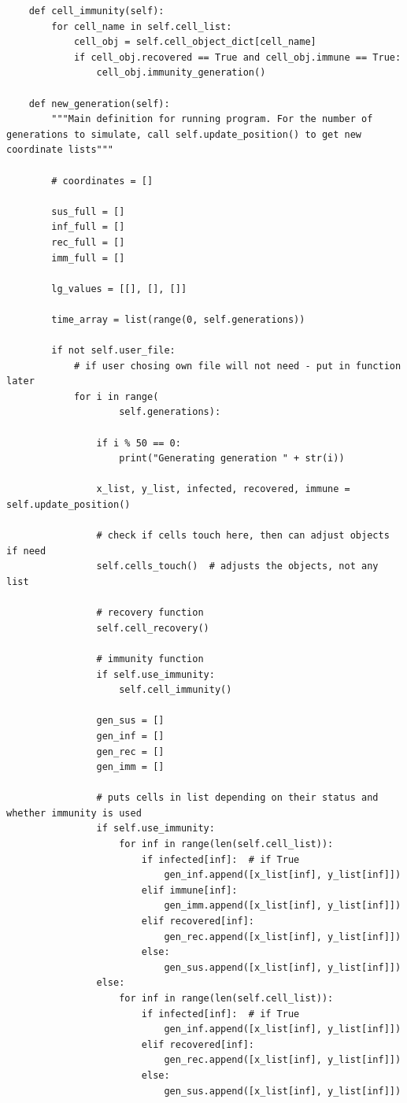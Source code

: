 \documentclass[11pt, a4paper]{article}
\begin{document}
\begin{lstlisting}
    def cell_immunity(self):
        for cell_name in self.cell_list:
            cell_obj = self.cell_object_dict[cell_name]
            if cell_obj.recovered == True and cell_obj.immune == True:
                cell_obj.immunity_generation()

    def new_generation(self):
        """Main definition for running program. For the number of generations to simulate, call self.update_position() to get new coordinate lists"""

        # coordinates = []

        sus_full = []
        inf_full = []
        rec_full = []
        imm_full = []

        lg_values = [[], [], []]

        time_array = list(range(0, self.generations))

        if not self.user_file:
            # if user chosing own file will not need - put in function later
            for i in range(
                    self.generations):

                if i % 50 == 0:
                    print("Generating generation " + str(i))

                x_list, y_list, infected, recovered, immune = self.update_position()

                # check if cells touch here, then can adjust objects if need
                self.cells_touch()  # adjusts the objects, not any list

                # recovery function
                self.cell_recovery()

                # immunity function
                if self.use_immunity:
                    self.cell_immunity()

                gen_sus = []
                gen_inf = []
                gen_rec = []
                gen_imm = []

                # puts cells in list depending on their status and whether immunity is used
                if self.use_immunity:
                    for inf in range(len(self.cell_list)):
                        if infected[inf]:  # if True
                            gen_inf.append([x_list[inf], y_list[inf]])
                        elif immune[inf]:
                            gen_imm.append([x_list[inf], y_list[inf]])
                        elif recovered[inf]:
                            gen_rec.append([x_list[inf], y_list[inf]])
                        else:
                            gen_sus.append([x_list[inf], y_list[inf]])
                else:
                    for inf in range(len(self.cell_list)):
                        if infected[inf]:  # if True
                            gen_inf.append([x_list[inf], y_list[inf]])
                        elif recovered[inf]:
                            gen_rec.append([x_list[inf], y_list[inf]])
                        else:
                            gen_sus.append([x_list[inf], y_list[inf]])
                            


\end{lstlisting}
\end{document}
